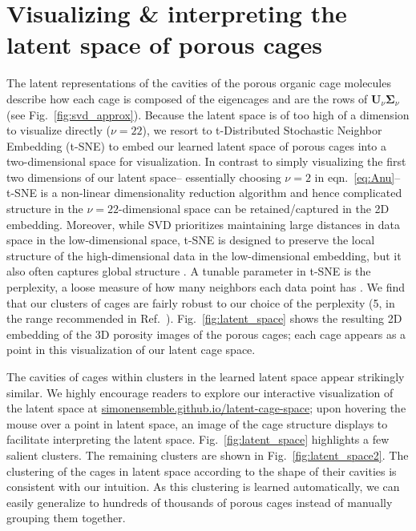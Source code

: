 \documentclass[journal=jacsat,manuscript=article,layout=traditional]{achemso}
\begin{document}
\section{\color{red} Visualizing \& interpreting the latent space of porous cages} 
The latent representations of the cavities of the porous organic cage molecules describe how each cage is composed of the eigencages and are the rows of $\mathbf{U}_\nu \mathbf{\Sigma}_\nu$ (see Fig.~\ref{fig:svd_approx}). {\color{red} Because the latent space is of too high of a dimension to visualize directly ($\nu=22$), we resort to t-Distributed Stochastic Neighbor Embedding (t-SNE) \cite{maaten2008visualizing,wattenberg2016how} to embed our learned latent space of porous cages into a two-dimensional space for visualization. 
In contrast to simply visualizing the first two dimensions of our latent space-- essentially choosing $\nu=2$ in eqn.~\ref{eq:Anu}-- t-SNE is a non-linear dimensionality reduction algorithm and hence complicated structure in the $\nu=22$-dimensional space can be retained/captured in the 2D embedding. Moreover, while  SVD prioritizes maintaining large distances in data space in the low-dimensional space, t-SNE is designed to preserve the local structure of the high-dimensional data in the low-dimensional embedding, but it also often captures global structure \cite{maaten2008visualizing}. 
A tunable parameter in t-SNE is the perplexity, a loose measure of how many neighbors each data point has \cite{maaten2008visualizing,wattenberg2016how}. We find that our clusters of cages are fairly robust to our choice of the perplexity (5, in the range recommended in Ref.~\cite{maaten2008visualizing}).
} Fig.~\ref{fig:latent_space} shows the resulting 2D embedding of the 3D porosity images of the porous cages; each cage appears as a point in this visualization of our latent cage space.

The cavities of cages within clusters in the learned latent space appear strikingly similar.
We highly encourage readers to explore our interactive visualization of the latent space at \url{simonensemble.github.io/latent-cage-space}; upon hovering the mouse over a point in latent space, an image of the cage structure displays to facilitate interpreting the latent space. Fig.~\ref{fig:latent_space} highlights a few salient clusters. The remaining clusters are shown in Fig.~\ref{fig:latent_space2}. The clustering of the cages in latent space according to the shape of their cavities is consistent with our intuition. As this clustering is learned automatically, we can easily generalize to hundreds of thousands of porous cages instead of manually grouping them together. 
\end{document}
